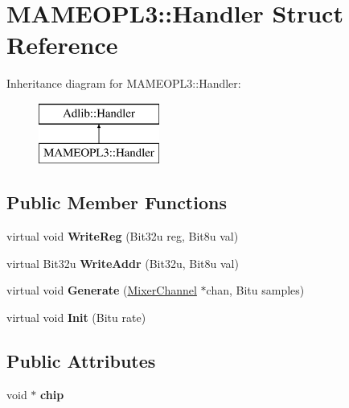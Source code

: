 \hypertarget{structMAMEOPL3_1_1Handler}{\section{M\-A\-M\-E\-O\-P\-L3\-:\-:Handler Struct Reference}
\label{structMAMEOPL3_1_1Handler}
}
Inheritance diagram for M\-A\-M\-E\-O\-P\-L3\-:\-:Handler\-:\begin{figure}[H]
\begin{center}
\leavevmode
\includegraphics[height=2.000000cm]{structMAMEOPL3_1_1Handler}
\end{center}
\end{figure}
\subsection*{Public Member Functions}
\begin{DoxyCompactItemize}
\item 
\hypertarget{structMAMEOPL3_1_1Handler_a903af88fdc2e8d43f6ac1f6da3645641}{virtual void {\bfseries Write\-Reg} (Bit32u reg, Bit8u val)}\label{structMAMEOPL3_1_1Handler_a903af88fdc2e8d43f6ac1f6da3645641}

\item 
\hypertarget{structMAMEOPL3_1_1Handler_a86658776086c980510f7d684ac71fc1d}{virtual Bit32u {\bfseries Write\-Addr} (Bit32u, Bit8u val)}\label{structMAMEOPL3_1_1Handler_a86658776086c980510f7d684ac71fc1d}

\item 
\hypertarget{structMAMEOPL3_1_1Handler_a6cee2abd16dd077eceb58117fad9bcd7}{virtual void {\bfseries Generate} (\hyperlink{classMixerChannel}{Mixer\-Channel} $\ast$chan, Bitu samples)}\label{structMAMEOPL3_1_1Handler_a6cee2abd16dd077eceb58117fad9bcd7}

\item 
\hypertarget{structMAMEOPL3_1_1Handler_a89c2dcd0b41d1da12ef7a98dc51d2f9f}{virtual void {\bfseries Init} (Bitu rate)}\label{structMAMEOPL3_1_1Handler_a89c2dcd0b41d1da12ef7a98dc51d2f9f}

\end{DoxyCompactItemize}
\subsection*{Public Attributes}
\begin{DoxyCompactItemize}
\item 
\hypertarget{structMAMEOPL3_1_1Handler_a77812ce708e65a61b562062ecfb52ce2}{void $\ast$ {\bfseries chip}}\label{structMAMEOPL3_1_1Handler_a77812ce708e65a61b562062ecfb52ce2}

\end{DoxyCompactItemize}


